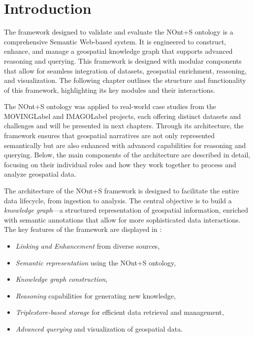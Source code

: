 \section{Introduction}\label{VI-sec:introduction}

The framework designed to validate and evaluate the NOnt+S ontology is a comprehensive Semantic Web-based system. It is engineered to construct, enhance, and manage a geospatial knowledge graph that supports advanced reasoning and querying. This framework is designed with modular components that allow for seamless integration of datasets, geospatial enrichment, reasoning, and visualization. The following chapter outlines the structure and functionality of this framework, highlighting its key modules and their interactions.

The NOnt+S ontology was applied to real-world case studies from the \acrshort{MOVINGLabel}\cite{MOVINGHorizon2020} and \acrshort{IMAGOLabel}\cite{IMAGOProject} projects, each offering distinct datasets and challenges and will be presented in next chapters. Through its architecture, the framework ensures that geospatial narratives are not only represented semantically but are also enhanced with advanced capabilities for reasoning and querying. Below, the main components of the architecture are described in detail, focusing on their individual roles and how they work together to process and analyze geospatial data.

The architecture of the NOnt+S framework is designed to facilitate the entire data lifecycle, from ingestion to analysis. The central objective is to build a \textit{knowledge graph}—a structured representation of geospatial information, enriched with semantic annotations that allow for more sophisticated data interactions. The key features of the framework are displayed in  :
\begin{itemize}
    \item \textit{Linking and Enhancement} from diverse sources,
    \item \textit{Semantic representation} using the NOnt+S ontology,
    \item \textit{Knowledge graph construction},
    \item \textit{Reasoning} capabilities for generating new knowledge,
    \item \textit{Triplestore-based storage} for efficient data retrieval and management,
    \item \textit{Advanced querying} and visualization of geospatial data.
\end{itemize}

